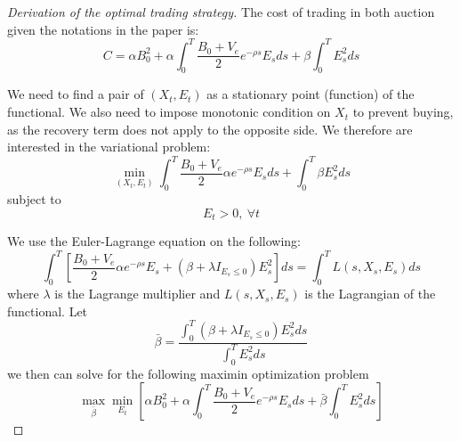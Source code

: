 \documentclass{article}
\begin{document}
\begin{proof}[Derivation of the optimal trading strategy]\label{proof:optimal-strategy}
  The cost of trading in both auction given the notations in the paper is:
  \[
    C = \alpha B_0^2  + \alpha \int_0^T \frac{B_0 + V_e}{2} e^{-\rho s} E_s ds + \beta \int_0^T E_s^2 ds
  \]

  We need to find a pair of $(X_t, E_t)$ as a stationary point (function) of the functional. We also need to impose monotonic condition on $X_t$ to prevent buying, as the recovery term does not apply to the opposite side. We therefore are interested in the variational problem:
  \[
    \min_{(X_t, E_t)} \int_0^T \frac{B_0 + V_e}{2} \alpha e^{-\rho s} E_s ds + \int_0^T \beta E_s^2 ds
  \]
  subject to
  \[
    E_t > 0,\ \forall t
  \]

  We use the Euler-Lagrange equation on the following:
  \[
    \int_0^T [ \frac{B_0 + V_e}{2} \alpha e^{-\rho s} E_s + (\beta + \lambda I_{E_s \leq 0}) E_s^2 ] ds=\int_0^T L(s, X_s, E_s) ds
  \]
  where $\lambda$ is the Lagrange multiplier and $L(s, X_s, E_s)$ is the Lagrangian of the functional. Let
  \[
    \bar{\beta} =  \frac{\int_0^T (\beta + \lambda I_{E_s \leq 0}) E_s^2 ds}{\int_0^T E_s^2 ds}
  \]
  we then can solve for the following maximin optimization problem
  \[
    \max_{\bar{\beta}} \min_{E_t} \left[ \alpha B_0^2  + \alpha \int_0^T \frac{B_0 + V_e}{2} e^{-\rho s} E_s ds + \bar{\beta} \int_0^T E_s^2 ds \right]
  \]


\end{proof}
\end{document}
